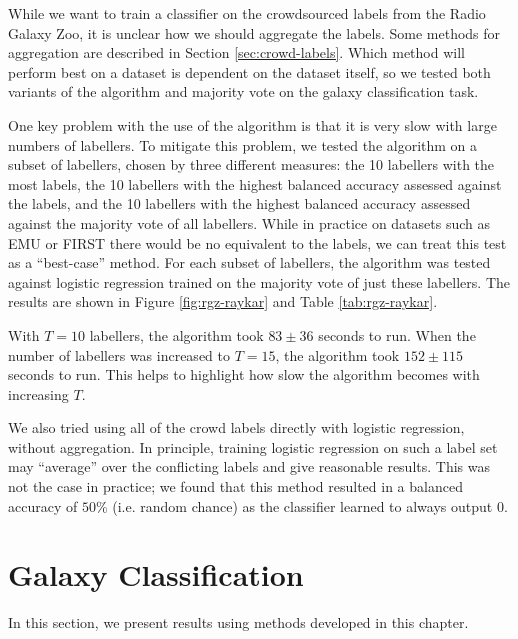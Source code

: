   While we want to train a classifier on the crowdsourced labels from the Radio
  Galaxy Zoo, it is unclear how we should aggregate the labels. Some methods for
  aggregation are described in Section \ref{sec:crowd-labels}. Which method will
  perform best on a dataset is dependent on the dataset itself, so we tested
  both variants of the \citeauthor{raykar10} algorithm and majority vote on the
  galaxy classification task.

  One key problem with the use of the \citeauthor{raykar10} algorithm is that it
  is very slow with large numbers of labellers. To mitigate this problem, we
  tested the algorithm on a subset of labellers, chosen by three different
  measures: the 10 labellers with the most labels, the 10 labellers with the
  highest balanced accuracy assessed against the \citeauthor{norris06} labels,
  and the 10 labellers with the highest balanced accuracy assessed against the
  majority vote of all labellers. While in practice on datasets such as EMU or
  FIRST there would be no equivalent to the \citeauthor{norris06} labels, we can
  treat this test as a ``best-case'' method. For each subset of labellers, the
  \citeauthor{raykar10} algorithm was tested against logistic regression trained
  on the majority vote of just these labellers. The results are shown in Figure
  \ref{fig:rgz-raykar} and Table \ref{tab:rgz-raykar}.

  With $T = 10$ labellers, the \citeauthor{raykar10} algorithm took $83 \pm 36$
  seconds to run. When the number of labellers was increased to $T = 15$, the
  \citeauthor{raykar10} algorithm took $152 \pm 115$ seconds to run. This helps
  to highlight how slow the algorithm becomes with increasing $T$.

  We also tried using all of the crowd labels directly with logistic regression,
  without aggregation. In principle, training logistic regression on such a
  label set may ``average'' over the conflicting labels and give reasonable
  results. This was not the case in practice; we found that this method resulted
  in a balanced accuracy of $50\%$ (i.e. random chance) as the classifier
  learned to always output 0.

\section{Galaxy Classification}
\label{sec:rgz-results}

  In this section, we present results using methods developed in this chapter.

